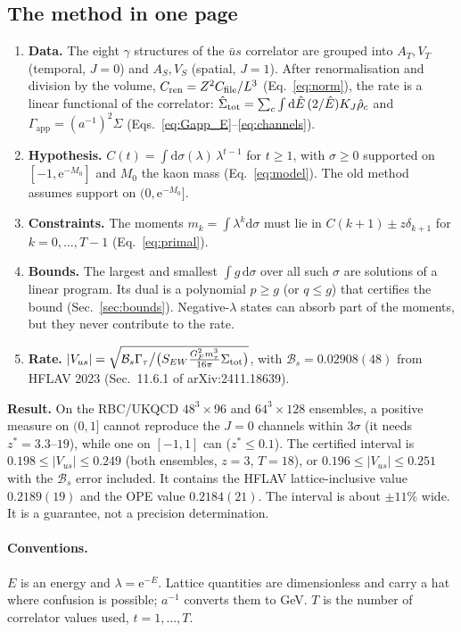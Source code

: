 \documentclass[11pt]{article}
\newcommand{\dd}{\mathrm{d}}
\newcommand{\ee}{\mathrm{e}}
\newcommand{\Vus}{|V_{us}|}
\newcommand{\Gapp}{\Gamma_{\mathrm{app}}}
\newcommand{\BR}{\mathcal{B}}
\theoremstyle{remark}
\begin{document}
\subsection{The method in one page}\label{sec:summary}
\begin{enumerate}[leftmargin=*,itemsep=2pt]
\item \textbf{Data.} The eight $\gamma$ structures of the $\bar us$ correlator are grouped into $A_T,V_T$ (temporal, $J=0$) and $A_S,V_S$ (spatial, $J=1$).
      After renormalisation and division by the volume, $C_{\rm ren}=Z^2C_{\rm file}/L^3$ (Eq.~\ref{eq:norm}), the rate is a linear functional of the correlator:
      $\hat\Sigma_{\rm tot}=\sum_c\int\dd\hat E\,(2/\hat E)K_J\hat\rho_c$ and $\Gapp=(a^{-1})^2\hat\Sigma$ (Eqs.~\ref{eq:Gapp_E}--\ref{eq:channels}).
\item \textbf{Hypothesis.} $C(t)=\int\dd\sigma(\lambda)\,\lambda^{t-1}$ for $t\ge1$, with $\sigma\ge0$ supported on $[-1,\ee^{-M_0}]$ and $M_0$ the kaon mass (Eq.~\ref{eq:model}).
      The old method assumes support on $(0,\ee^{-M_0}]$.
\item \textbf{Constraints.} The moments $m_k=\int\lambda^k\dd\sigma$ must lie in $C(k+1)\pm z\delta_{k+1}$ for $k=0,\dots,T-1$ (Eq.~\ref{eq:primal}).
\item \textbf{Bounds.} The largest and smallest $\int g\,\dd\sigma$ over all such $\sigma$ are solutions of a linear program. Its dual is a polynomial $p\ge g$ (or $q\le g$) that
      certifies the bound (Sec.~\ref{sec:bounds}). Negative-$\lambda$ states can absorb part of the moments, but they never contribute to the rate.
\item \textbf{Rate.} $\Vus=\sqrt{\BR_s\Gamma_\tau\big/\big(S_{EW}\tfrac{G_F^2m_\tau^3}{16\pi}\Sigma_{\rm tot}\big)}$, with
      $\BR_s=0.02908(48)$ from HFLAV 2023 (Sec.~11.6.1 of arXiv:2411.18639).
\end{enumerate}
\textbf{Result.} On the RBC/UKQCD $48^3\times96$ and $64^3\times128$ ensembles, a positive measure on $(0,1]$ cannot reproduce the $J=0$ channels within $3\sigma$
(it needs $z^*=3.3$--$19$), while one on $[-1,1]$ can ($z^*\le0.1$). The certified interval is $0.198\le\Vus\le0.249$ (both ensembles, $z=3$, $T=18$), or
$0.196\le\Vus\le0.251$ with the $\BR_s$ error included. It contains the HFLAV lattice-inclusive value $0.2189(19)$ and the OPE value $0.2184(21)$.
The interval is about $\pm11\%$ wide. It is a guarantee, not a precision determination.

\paragraph{Conventions.} $E$ is an energy and $\lambda=\ee^{-E}$. Lattice quantities are dimensionless and carry a hat where confusion is possible;
$a^{-1}$ converts them to GeV. $T$ is the number of correlator values used, $t=1,\dots,T$.
\end{document}
